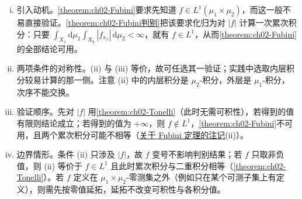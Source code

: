 \documentclass[../../main.tex]{subfiles}%
\begin{document}
\begin{remark}\label{remark:ch02-Fubini判别动机}
\begin{enumerate}[(i)]
\item 引入动机。\cref{theorem:ch02-Fubini}要求先知道 $f\in L^1(\mu_1\times\mu_2)$，而这一般不易直接验证。\cref{theorem:ch02-Fubini判别}把该要求化归为对 $|f|$ 计算一次累次积分：只要 $\int_{X_1}\mathrm{d}\mu_1\int_{X_2}|f_{x_1}|\,\mathrm{d}\mu_2<\infty$，就有 $f\in L^1$，从而\cref{theorem:ch02-Fubini}的全部结论可用。
\item 两项条件的对称性。(ii) 与 (iii) 等价，故可任选其一验证；实践中选取内层积分较易计算的那一侧。注意 (ii) 中的内层积分是 $\mu_2$-积分，外层是 $\mu_1$-积分，次序不能交换。
\item 验证顺序。先对 $|f|$ 用\cref{theorem:ch02-Tonelli}（此时无需可积性），若得到的值有限则结论成立；若得到的值为 $+\infty$，则 $f\notin L^1$，\cref{theorem:ch02-Fubini}不可用，且两个累次积分可能不相等（\hyperref[remark:ch02-Fubini动机]{关于 Fubini 定理的注记}(ii)）。
\item 边界情形。条件 (ii) 只涉及 $|f|$，故 $f$ 变号不影响判别结果；若 $f$ 只取非负值，则 (ii) 等价于 $f\in L^1$ 且此时累次积分与二重积分相等（\cref{theorem:ch02-Tonelli}）。若 $f$ 定义在 $\mu_1\times\mu_2$-零测集之外（例如只在某个可测子集上有定义），则需先按零值延拓，延拓不改变可积性与各积分值。
\end{enumerate}
\end{remark}
\end{document}
